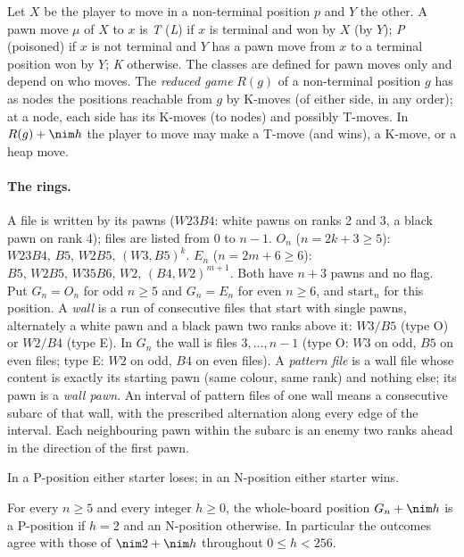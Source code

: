 Let $X$ be the player to move in a non-terminal position $p$ and $Y$ the other. A pawn move $\mu$ of $X$ to $x$ is \emph{T} (\emph{L}) if
$x$ is terminal and won by $X$ (by $Y$); \emph{P} (poisoned) if $x$ is not terminal and $Y$ has a pawn move from $x$ to a terminal
position won by $Y$; \emph{K} otherwise. The classes are defined for pawn moves only and depend on who moves. The \emph{reduced game}
$R(g)$ of a non-terminal position $g$ has as nodes the positions reachable from $g$ by K-moves (of either side, in any order); at a node,
each side has its K-moves (to nodes) and possibly T-moves. In $R(g)+\nim h$ the player to move may make a T-move (and wins), a K-move,
or a heap move.

\paragraph{The rings.}
A file is written by its pawns ($W23B4$: white pawns on ranks 2 and 3, a black pawn on rank 4); files are listed from $0$ to $n-1$.
$O_n$ ($n=2k+3\ge5$): $W23B4,\,B5,\,W2B5,\,(W3,B5)^k$.\quad
$E_n$ ($n=2m+6\ge6$): $B5,\,W2B5,\,W35B6,\,W2,\,(B4,W2)^{m+1}$. Both have $n+3$ pawns and no flag.
Put $G_n=O_n$ for odd $n\ge5$ and $G_n=E_n$ for even $n\ge6$, and $\mathrm{start}_n$ for this position.
A \emph{wall} is a run of consecutive files that start with single pawns, alternately a white pawn and a black pawn two ranks above it:
$W3/B5$ (type O) or $W2/B4$ (type E). In $G_n$ the wall is files $3,\dots,n-1$ (type O: $W3$ on odd, $B5$ on even files; type E: $W2$ on
odd, $B4$ on even files). A \emph{pattern file} is a wall file whose content is exactly its starting pawn (same colour, same rank) and
nothing else; its pawn is a \emph{wall pawn}. An interval of pattern files of one wall means a consecutive subarc of that wall, with the prescribed alternation along every edge of the interval. Each neighbouring pawn within the subarc is an enemy two ranks ahead in the direction of the first pawn.

In a P-position either starter loses; in an N-position either starter wins.

\begin{wtheorem}
For every $n\ge5$ and every integer $h\ge0$, the whole-board position $G_n+\nim h$ is a P-position if $h=2$ and an N-position
otherwise. In particular the outcomes agree with those of $\nim2+\nim h$ throughout $0\le h<256$.
\end{wtheorem}

